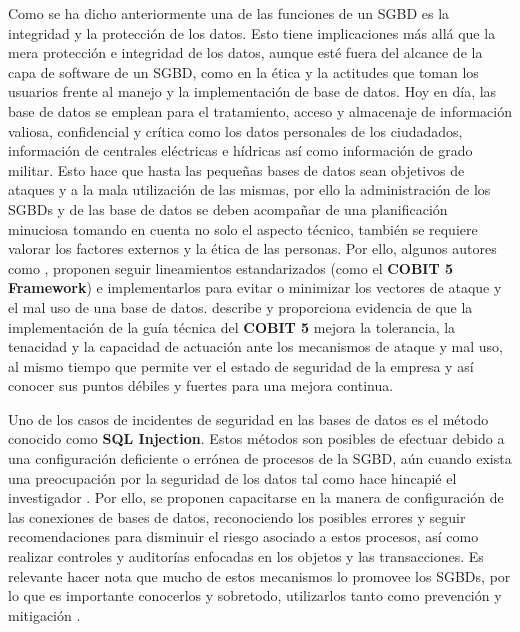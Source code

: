 \documentclass[12pt]{article}
\begin{document}

Como se ha dicho anteriormente una de las funciones de un SGBD es la integridad y la protección de los datos. Esto tiene implicaciones más allá que la mera protección e integridad de los datos, aunque esté fuera del alcance de la capa de software de un SGBD, como en la ética y la actitudes que toman los usuarios frente al manejo y la implementación de base de datos. Hoy en día, las base de datos se emplean para el tratamiento, acceso y almacenaje de información valiosa, confidencial y crítica como los datos personales de los ciudadados, información de centrales eléctricas e hídricas así como información de grado militar. Esto hace que hasta las pequeñas bases de datos sean objetivos de ataques y a la mala utilización de las mismas, por ello la administración de los SGBDs y de las base de datos se deben acompañar de una planificación minuciosa tomando en cuenta no solo el aspecto técnico, también se requiere valorar los factores externos y la ética de las personas. Por ello, algunos autores como \textcite{Navas2018}, proponen seguir lineamientos estandarizados (como el \textbf{COBIT 5 Framework}) e implementarlos para evitar o minimizar los vectores de ataque y el mal uso de una base de datos. \textcite{Navas2018} describe y proporciona evidencia de que la implementación de la guía técnica del \textbf{COBIT 5} mejora la tolerancia, la tenacidad y la capacidad de actuación ante los mecanismos de ataque y mal uso, al mismo tiempo que permite ver el estado de seguridad de la empresa y así conocer sus puntos débiles y fuertes para una mejora continua.
\newline

Uno de los casos de incidentes de seguridad en las bases de datos es el método conocido como \textbf{SQL Injection}. Estos métodos son posibles de efectuar debido a una configuración deficiente o errónea de procesos de la SGBD, aún cuando exista una preocupación por la seguridad de los datos tal como hace hincapié el investigador \textcite{Villalobos2008a}. Por ello, se proponen capacitarse en la manera de configuración de las conexiones de bases de datos, reconociendo los posibles errores y seguir recomendaciones para disminuir el riesgo asociado a estos procesos, así como realizar controles y auditorías enfocadas en los objetos y las transacciones. Es relevante hacer nota que mucho de estos mecanismos lo promovee los SGBDs, por lo que es importante conocerlos y sobretodo, utilizarlos tanto como prevención y mitigación \parencite{Villalobos2008b}.
\newpage
\end{document}
